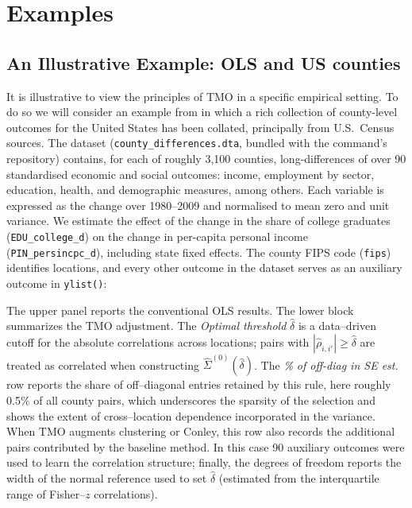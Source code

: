 \documentclass[varwidth,bib]{statapress}
\begin{document}
\section{Examples}
\label{scn:examples}
\subsection{An Illustrative Example: OLS and US counties}
It is illustrative to view the principles of TMO in a specific empirical setting.  To do so we will consider an example from \citet{Dellavignaetal2025} in which a rich collection of county-level outcomes for the United States has been collated, principally from U.S.\ Census sources.  The dataset ({\tt county\_differences.dta}, bundled with the command's repository) contains, for each of roughly 3,100 counties, long-differences of over 90 standardised economic and social outcomes: income, employment by sector, education, health, and demographic measures, among others.  Each variable is expressed as the change over 1980--2009 and normalised to mean zero and unit variance.  We estimate the effect of the change in the share of college graduates ({\tt EDU\_college\_d}) on the change in per-capita personal income ({\tt PIN\_persincpc\_d}), including state fixed effects.  The county FIPS code ({\tt fips}) identifies locations, and every other outcome in the dataset serves as an auxiliary outcome in {\tt ylist()}:

  \begin{stlog}
    
  \end{stlog}


The upper panel reports the conventional OLS results. The lower block summarizes the TMO adjustment. The \textit{Optimal threshold} $\hat\delta$ is a data–driven cutoff for the absolute correlations across locations; pairs with $|\hat\rho_{i,i'}|\ge\hat\delta$ are treated as correlated when constructing $\widehat{\Sigma}^{(0)}(\hat\delta)$. The \textit{\% of off-diag in SE est.} row reports the share of off–diagonal entries retained by this rule, here roughly 0.5\% of all county pairs, which underscores the sparsity of the selection and shows the extent of cross–location dependence incorporated in the variance. When TMO augments clustering or Conley, this row also records the additional pairs contributed by the baseline method. In this case 90 auxiliary outcomes were used to learn the correlation structure; finally, the degrees of freedom reports the width of the normal reference used to set $\hat\delta$ (estimated from the interquartile range of Fisher–$z$ correlations).
\end{document}
